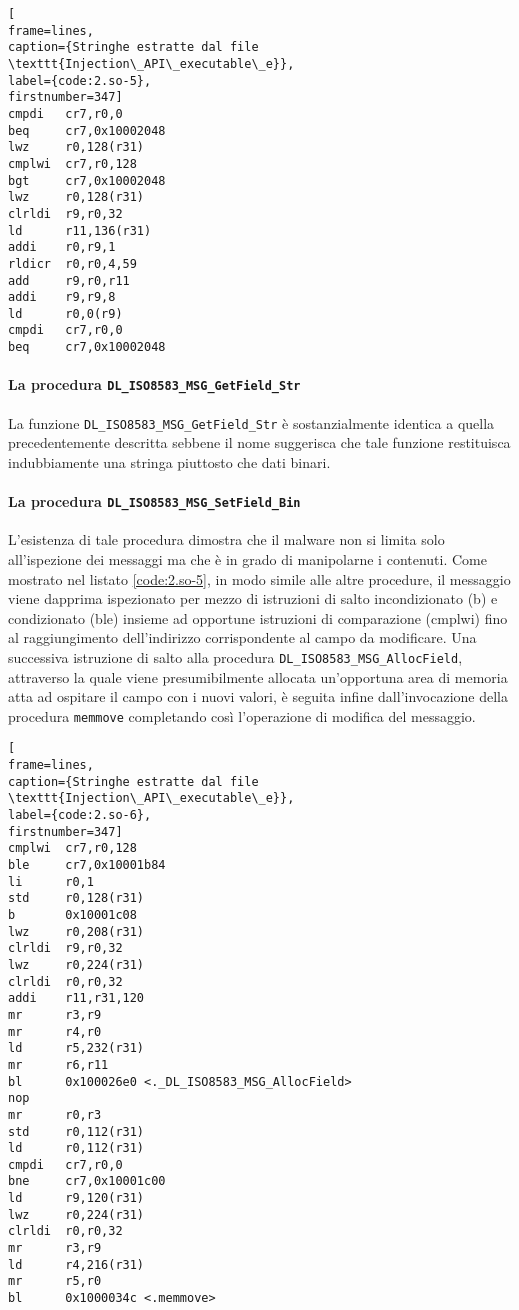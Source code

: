 \documentclass[10pt,a4paper, titlepage]{report}
\begin{document}
\begin{lstlisting}[
frame=lines, 
caption={Stringhe estratte dal file \texttt{Injection\_API\_executable\_e}}, 
label={code:2.so-5},
firstnumber=347]
cmpdi   cr7,r0,0
beq     cr7,0x10002048
lwz     r0,128(r31)
cmplwi  cr7,r0,128
bgt     cr7,0x10002048
lwz     r0,128(r31)
clrldi  r9,r0,32
ld      r11,136(r31)
addi    r0,r9,1
rldicr  r0,r0,4,59
add     r9,r0,r11
addi    r9,r9,8
ld      r0,0(r9)
cmpdi   cr7,r0,0
beq     cr7,0x10002048
\end{lstlisting}

\paragraph{La procedura \texttt{DL\_ISO8583\_MSG\_GetField\_Str}}

La funzione \texttt{DL\_ISO8583\_MSG\_GetField\_Str} è sostanzialmente identica a quella precedentemente descritta sebbene il nome suggerisca che tale funzione restituisca indubbiamente una stringa piuttosto che dati binari.

\paragraph{La procedura \texttt{DL\_ISO8583\_MSG\_SetField\_Bin}}

L'esistenza di tale procedura dimostra che il malware non si limita solo all'ispezione dei messaggi ma che è in grado di manipolarne i contenuti. 
Come mostrato nel listato \ref{code:2.so-5}, in modo simile alle altre procedure, il messaggio viene dapprima ispezionato per mezzo di istruzioni di salto incondizionato (b) e condizionato (ble) insieme ad opportune istruzioni di comparazione (cmplwi) fino al raggiungimento dell'indirizzo corrispondente al campo da modificare.
Una successiva istruzione di salto alla procedura \texttt{DL\_ISO8583\_MSG\_AllocField}, attraverso la quale viene presumibilmente allocata un'opportuna area di memoria atta ad ospitare il campo con i nuovi valori, è seguita infine dall'invocazione della procedura \texttt{memmove} completando così l'operazione di modifica del messaggio.

\begin{lstlisting}[
frame=lines, 
caption={Stringhe estratte dal file \texttt{Injection\_API\_executable\_e}}, 
label={code:2.so-6},
firstnumber=347]
cmplwi  cr7,r0,128
ble     cr7,0x10001b84
li      r0,1
std     r0,128(r31)
b       0x10001c08
lwz     r0,208(r31)
clrldi  r9,r0,32
lwz     r0,224(r31)
clrldi  r0,r0,32
addi    r11,r31,120
mr      r3,r9
mr      r4,r0
ld      r5,232(r31)
mr      r6,r11
bl      0x100026e0 <._DL_ISO8583_MSG_AllocField>
nop
mr      r0,r3
std     r0,112(r31)
ld      r0,112(r31)
cmpdi   cr7,r0,0
bne     cr7,0x10001c00
ld      r9,120(r31)
lwz     r0,224(r31)
clrldi  r0,r0,32
mr      r3,r9
ld      r4,216(r31)
mr      r5,r0
bl      0x1000034c <.memmove>
\end{lstlisting}
\end{document}
